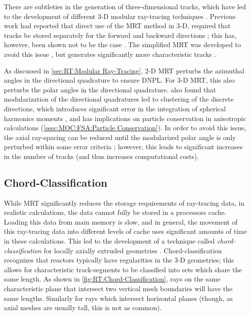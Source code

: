 {{{            There are subtleties in the generation of three-dimensional tracks, which have led to the development of different 3-D modular ray-tracing techniques \cite{Kochunas2013,Shaner2015}.
            Previous work had reported that direct use of the \ac{MRT} method in 3-D, required that tracks be stored separately for the forward and backward directions \cite{Kochunas2013};
            this has, however, been shown not to be the case \cite{Shaner2015}.
            The simplified \ac{MRT} was developed to avoid this issue \cite{Kochunas2013}, but generates significantly more characteristic tracks \cite{Shaner2015}.

            As discussed in \cref{sec:RT:Modular Ray-Tracing}, 2-D \ac{MRT} perturbs the azimuthal angles in the directional quadrature to ensure \ac{DNPL}.
            For 3-D \ac{MRT}, this also perturbs the polar angles in the directional quadrature.
            \citet{Kochunas2013} also found that modularization of the directional quadratures led to clustering of the discrete directions, which introduces significant error in the integration of spherical harmonics moments \cite{Kochunas2013}, and has implications on particle conservation in anisotropic calculations (\cref{ssec:MOC:FSA:Particle Conservation}).
            In order to avoid this issue, the axial ray-spacing can be reduced until the modularized polar angle is only perturbed within some error criteria \cite{Kochunas2013}; however, this leads to significant increases in the number of tracks (and thus increases computational costs).
        }
        \subsection{Chord-Classification}{\label{ssec:RT:Chord-Classification}
            While \ac{MRT} significantly reduces the storage requirements of ray-tracing data, in realistic calculations, the data cannot fully be stored in a processors cache.
            Loading this data from main memory is slow, and in general, the movement of this ray-tracing data into different levels of cache uses significant amounts of time in these calculations.
            This led to the development of a technique called \emph{chord-classification} for locally axially extruded geometries \cite{Sciannandrone2016}.
            Chord-classification recognizes that reactors typically have regularities in the 3-D geometries; this allows for characteristic track-segments to be classified into sets which share the same length.
            As shown in \cref{fig:RT:Chord-Classification}, rays on the same characteristic plane that intersect two vertical mesh boundaries will have the same lengths.
            Similarly for rays which intersect horizontal planes (though, as axial meshes are usually tall, this is not as common).

}}}
